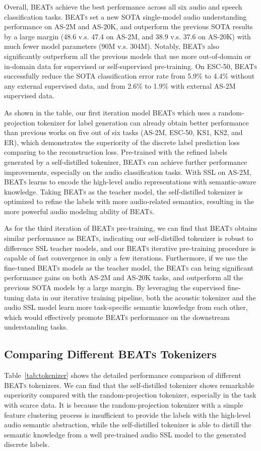 \documentclass{article}
\theoremstyle{plain}
\theoremstyle{definition}
\theoremstyle{remark}
\newcommand\our{\textsc{BEATs}}
\begin{document}
Overall, \our{} achieve the best performance across all six audio and speech classification tasks.
\our{} set a new SOTA  single-model audio understanding performance on AS-2M and AS-20K, and outperform the previous
SOTA results by a large margin (48.6 v.s. 47.4 on AS-2M, and 38.9 v.s. 37.6 on AS-20K) with much fewer model parameters (90M v.s. 304M). Notably, \our{}  also significantly outperform all the previous models that use more out-of-domain or in-domain data for supervised or self-supervised pre-training.
On ESC-50, \our{} successfully reduce the SOTA classification error rate from 5.9\% to 4.4\% without any external supervised data, and from 2.6\% to 1.9\% with external AS-2M supervised data.

As shown in the table, our first iteration model \our{} which uses a random-projection tokenizer for label generation can already obtain better performance than previous works on five out of six tasks (AS-2M, ESC-50, KS1, KS2, and ER), which demonstrates the superiority of the discrete label prediction loss  comparing to the reconstruction loss. Pre-trained with the refined labels generated by a self-distilled tokenizer, \our{} can achieve further performance improvements, especially on the audio classification tasks. 
With SSL on AS-2M, \our{} learns to encode the high-level audio representations with semantic-aware knowledge. Taking \our{} as the teacher model, the self-distilled tokenizer is optimized to refine the labels with more audio-related semantics, resulting in the more powerful audio modeling ability of \our{}.

As for the third iteration of \our{} pre-training, we can find that \our{} obtains similar performance as \our{}, indicating our self-distilled tokenizer is robust to difference SSL teacher models, and our \our{} iterative pre-training procedure is capable of fast convergence in only a few iterations.
Furthermore, if we use the fine-tuned \our{} models as the teacher model, the \our{} can bring significant performance gains on both AS-2M and AS-20K tasks, and outperform all the previous SOTA models by a large margin. 
By leveraging the supervised fine-tuning data in our iterative training pipeline, both the acoustic tokenizer and the audio SSL model learn more task-specific semantic knowledge from each other, which would effectively promote  \our{} performance on the downstream understanding tasks.

\subsection{Comparing Different \our{} Tokenizers}
Table~\ref{tab:tokenizer} shows the detailed performance comparison of different \our{} tokenizers.
We can find that the self-distilled tokenizer shows remarkable superiority compared with the random-projection tokenizer, especially in the task with scarce data. 
It is because the random-projection tokenizer with a simple feature clustering process is insufficient to provide the labels with the high-level audio semantic abstraction, while the self-distilled tokenizer is able to distill the semantic knowledge from a well pre-trained audio SSL model to the generated discrete labels. 
\end{document}
